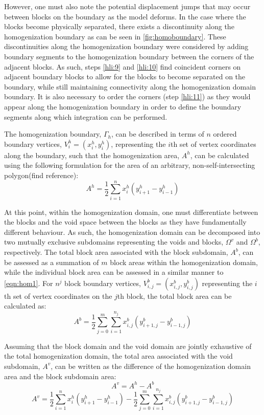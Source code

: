 However, one must also note the potential displacement jumps that
may occur between blocks on the boundary as the model deforms. In
the case where the blocks become physically separated, there exists
a discontinuity along the homogenization boundary as can be seen in
\ref{fig:homoboundary}. These discontinuities along the homogenization
boundary were considered by adding boundary segments to the homogenization
boundary between the corners of the adjacent blocks. As such, steps
\ref{hli:9} and \ref{hli:10} find coincident corners on adjacent
boundary blocks to allow for the blocks to become separated on the
boundary, while still maintaining connectivity along the homogenization
domain boundary. It is also necessary to order the corners (step \ref{hli:11})
as they would appear along the homogenization boundary in order to
define the boundary segments along which integration can be performed.

The homogenization boundary, $\Gamma_{h}$, can be described in terms
of $n$ ordered boundary vertices, $V_{i}^{h}=(x_{i}^{h},y_{i}^{h})$,
representing the $i$th set of vertex coordinates along the boundary,
such that the homogenization area, $A^{h}$, can be calculated using
the following formulation for the area of an arbitrary, non-self-intersecting
polygon(find reference): 
\begin{equation}
A^{h}=\dfrac{1}{2}\sum_{i=1}^{n}x_{i}^{h}(y_{i+1}^{h}-y_{i-1}^{h})\label{eqn:hom1}
\end{equation}


At this point, within the homogenization domain, one must differentiate
between the blocks and the void space between the blocks as they have
fundamentally different behaviour. As such, the homogenization domain
can be decomposed into two mutually exclusive subdomains representing
the voids and blocks, $\Omega^{v}$ and $\Omega^{b}$, respectively.
The total block area associated with the block subdomain, $A^{b}$,
can be assessed as a summation of $m$ block areas within the homogenization
domain, while the individual block area can be assessed in a similar
manner to \ref{eqn:hom1}. For $n^{j}$ block boundary vertices, $V_{i,j}^{b}=(x_{i,j}^{b},y_{i,j}^{b})$
representing the $i$th set of vertex coordinates on the $j$th block,
the total block area can be calculated as: 
\begin{equation}
A^{b}=\dfrac{1}{2}\sum_{j=0}^{m}\sum_{i=1}^{n_{j}}x_{i,j}^{b}(y_{i+1,j}^{b}-y_{i-1,j}^{b})\label{eqn:hom2}
\end{equation}


Assuming that the block domain and the void domain are jointly exhaustive
of the total homogenization domain, the total area associated with
the void subdomain, $A^{v}$, can be written as the difference of
the homogenization domain area and the block subdomain area: 
\begin{equation}
A^{v}=A^{h}-A^{b}\label{eqn:hom3}
\end{equation}
\begin{equation}
A^{v}=\dfrac{1}{2}\sum_{i=1}^{n}x_{i}^{h}(y_{i+1}^{h}-y_{i-1}^{h})-\dfrac{1}{2}\sum_{j=0}^{m}\sum_{i=1}^{n_{j}}x_{i,j}^{b}(y_{i+1,j}^{b}-y_{i-1,j}^{b})\label{eqn:hom4}
\end{equation}
